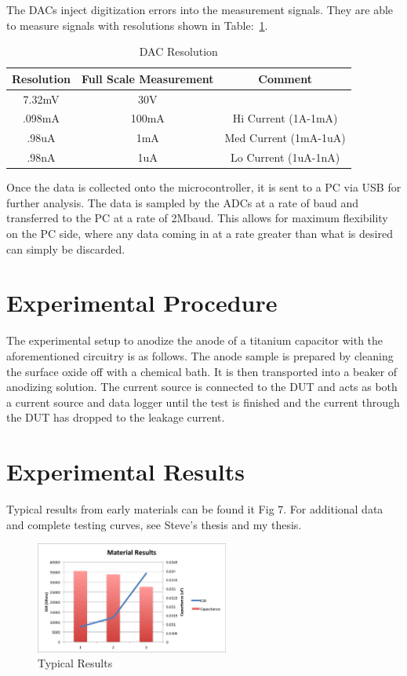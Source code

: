 \documentclass[journal]{IEEEtran}
\begin{document}
The DACs inject digitization errors into the measurement signals. They are able to measure signals with resolutions shown in Table:~\ref{tab:dacRes}.


\begin{table}[here]
\renewcommand{\arraystretch}{1.3}
\caption{DAC Resolution}
\label{tab:dacRes}
\centering
\begin{tabular}{c||c||c}
\hline
\bfseries Resolution & \bfseries Full Scale Measurement & \bfseries Comment\\
\hline\hline
7.32mV & 30V & \\
\hline\hline
.098mA & 100mA & Hi Current (1A-1mA)\\
\hline\hline
.98uA & 1mA & Med Current (1mA-1uA) \\
\hline\hline
.98nA & 1uA & Lo Current (1uA-1nA)\\
\hline
\end{tabular}
\end{table}

Once the data is collected onto the microcontroller, it is sent to a PC via USB for further analysis. The data is sampled by the ADCs at a rate of baud and transferred to the PC at a rate of 2Mbaud. This allows for maximum flexibility on the PC side, where any data coming in at a rate greater than what is desired can simply be discarded.

\section{Experimental Procedure}
The experimental setup to anodize the anode of a titanium capacitor with the aforementioned circuitry is as follows. The anode sample is prepared by cleaning the surface oxide off with a chemical bath. It is then transported into a beaker of anodizing solution. The current source is connected to the DUT and acts as both a current source and data logger until the test is finished and the current through the DUT has dropped to the leakage current.

\section{Experimental Results}
Typical results from early materials can be found it Fig 7. For additional data and complete testing curves, see Steve’s thesis and my thesis.

\begin{figure}[here]
\centering
\includegraphics[width=2.5in]{materialResults}
\caption{Typical Results}
\label{fig:materialResults}
\end{figure}
\end{document}
